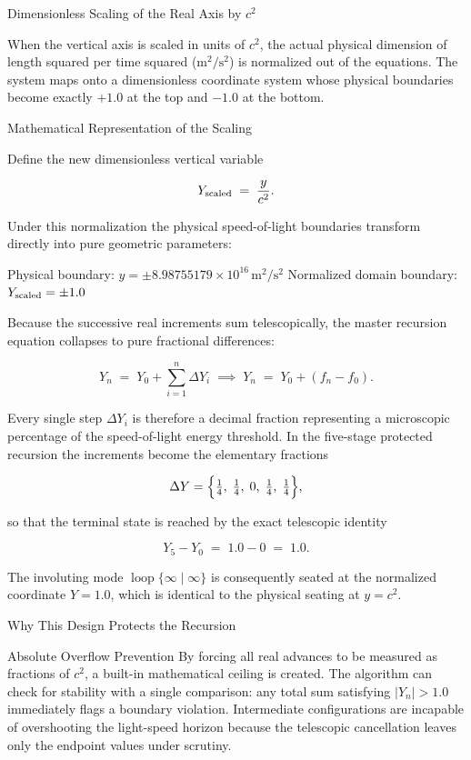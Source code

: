 Dimensionless Scaling of the Real Axis by \(c^2\)

When the vertical axis is scaled in units of \(c^2\), the actual physical dimension of length squared per time squared (\(\mathrm{m}^2/\mathrm{s}^2\)) is normalized out of the equations. The system maps onto a dimensionless coordinate system whose physical boundaries become exactly \(+1.0\) at the top and \(-1.0\) at the bottom.

Mathematical Representation of the Scaling

Define the new dimensionless vertical variable

\[
Y_{\rm scaled}
\;=\;
\frac{y}{c^2}.
\]

Under this normalization the physical speed-of-light boundaries transform directly into pure geometric parameters:

Physical boundary: \(y=\pm8.98755179\times10^{16}\,\mathrm{m}^2/\mathrm{s}^2\)
Normalized domain boundary: \(Y_{\rm scaled}=\pm1.0\)

Because the successive real increments sum telescopically, the master recursion equation collapses to pure fractional differences:

\[
Y_n
\;=\;
Y_0+\sum_{i=1}^{n}\Delta Y_i
\;\implies\;
Y_n
\;=\;
Y_0+(f_n-f_0).
\]

Every single step \(\Delta Y_i\) is therefore a decimal fraction representing a microscopic percentage of the speed-of-light energy threshold. In the five-stage protected recursion the increments become the elementary fractions

\[
\Delta Y=\Bigl\{\tfrac14,\;\tfrac14,\;0,\;\tfrac14,\;\tfrac14\Bigr\},
\]

so that the terminal state is reached by the exact telescopic identity

\[
Y_5-Y_0
\;=\;
1.0-0
\;=\;
1.0.
\]

The involuting mode \(\operatorname{loop}\{\infty\mid\infty\}\) is consequently seated at the normalized coordinate \(Y=1.0\), which is identical to the physical seating at \(y=c^2\).

Why This Design Protects the Recursion

Absolute Overflow Prevention  
By forcing all real advances to be measured as fractions of \(c^2\), a built-in mathematical ceiling is created. The algorithm can check for stability with a single comparison: any total sum satisfying \(|Y_n|>1.0\) immediately flags a boundary violation. Intermediate configurations are incapable of overshooting the light-speed horizon because the telescopic cancellation leaves only the endpoint values under scrutiny.


